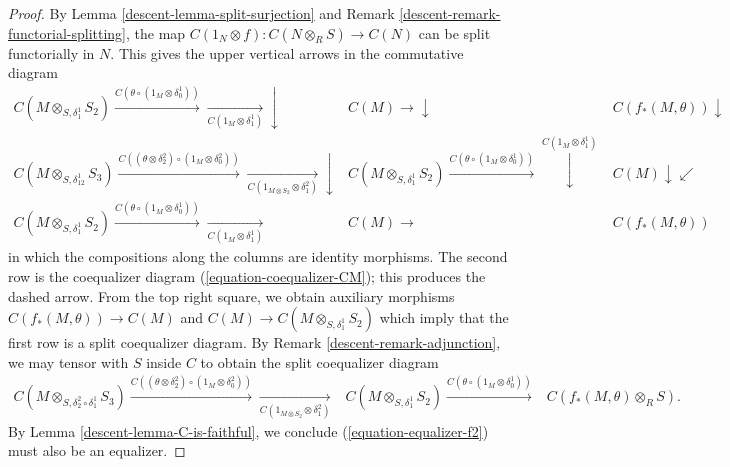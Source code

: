 \begin{proof}

By
Lemma \ref{descent-lemma-split-surjection} and
Remark \ref{descent-remark-functorial-splitting},
the map $C(1_N \otimes f): C(N \otimes_R S) \to C(N)$ can be split functorially
in $N$. This gives the upper vertical arrows in the commutative diagram
$$
\begin{array}{ccc}C(M \otimes_{S, \delta_1^1} S_2)
\overset{C(\theta \circ (1_M \otimes \delta_0^1))}{\longrightarrow}\underset{C(1_M \otimes \delta_1^1)}{\longrightarrow}\downarrow & C(M) \longrightarrow\downarrow & C(f_*(M,\theta)) \downarrow \\ C(M \otimes_{S,\delta_{12}^1} S_3)
\overset{C((\theta \otimes \delta_2^2) \circ (1_M \otimes \delta^2_0))}{\longrightarrow}\underset{C(1_{M \otimes S_2} \otimes \delta^2_1)}{\longrightarrow}\downarrow & C(M \otimes_{S, \delta_1^1} S_2 )
\overset{C(\theta \circ (1_M \otimes \delta_0^1))}{\longrightarrow}\overset{C(1_M \otimes \delta_1^1)}{\downarrow} & C(M) \downarrow\swarrow \\ C(M \otimes_{S, \delta_1^1} S_2)
\overset{C(\theta \circ (1_M \otimes \delta_0^1))}{\longrightarrow}\underset{C(1_M \otimes \delta_1^1)}{\longrightarrow} & C(M) \longrightarrow & C(f_*(M,\theta))\end{array}
$$
in which the compositions along the columns are identity morphisms.
The second row is the coequalizer diagram
(\ref{equation-coequalizer-CM}); this produces the dashed arrow.
From the top right square, we obtain auxiliary morphisms $C(f_*(M,\theta)) \to
C(M)$
and $C(M) \to C(M\otimes_{S,\delta_1^1} S_2)$ which imply that the first row is
a split coequalizer diagram.
By Remark \ref{descent-remark-adjunction}, we may tensor with $S$ inside $C$ to obtain
the split coequalizer diagram
$$
\begin{array}{ccc}C(M \otimes_{S,\delta_2^2 \circ \delta_1^1} S_3)
\overset{C((\theta \otimes \delta_2^2) \circ (1_M \otimes \delta^2_0))}{\longrightarrow}\underset{C(1_{M \otimes S_2} \otimes \delta^2_1)}{\longrightarrow} & C(M \otimes_{S, \delta_1^1} S_2 )
\overset{C(\theta \circ (1_M \otimes \delta_0^1))}{\longrightarrow} & C(f_*(M,\theta) \otimes_R S).\end{array}
$$
By Lemma \ref{descent-lemma-C-is-faithful}, we conclude
(\ref{equation-equalizer-f2}) must also be an equalizer.
\end{proof}

